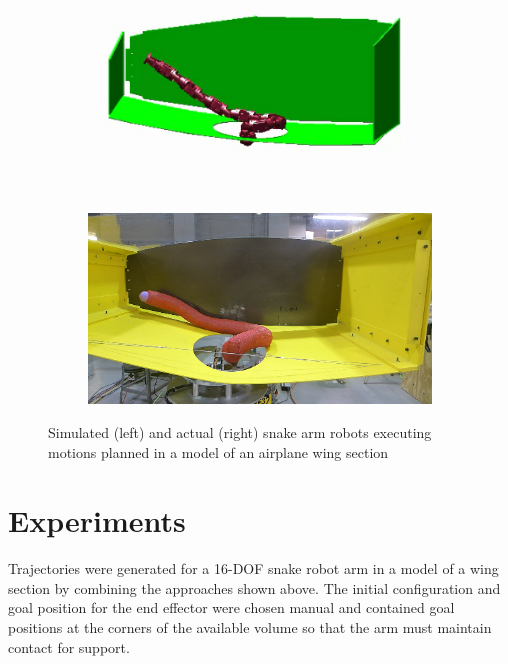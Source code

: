 \documentclass[../thesis.tex]{subfiles}
\begin{document}
\begin{figure}
  \centering
  \begin{subfigure}[b]{.48\linewidth}
    \includegraphics[width=\linewidth]{./Planning/simulated_snake_in_wing.png}
  \end{subfigure}
  \begin{subfigure}[b]{.48\linewidth}
    \includegraphics[width=\linewidth]{./Planning/real_snake_in_wing.png}
  \end{subfigure}
  
  \caption{Simulated (left) and actual (right) snake arm robots executing motions planned in a model of an airplane wing section}
  \label{fig:extend}
\end{figure}







\section{Experiments}
Trajectories were generated for a 16-DOF snake robot arm in a model of a wing section by combining the approaches shown above.
The initial configuration and goal position for the end effector were chosen manual and contained goal positions at the corners of the available volume so that the arm must maintain contact for support.
\end{document}
